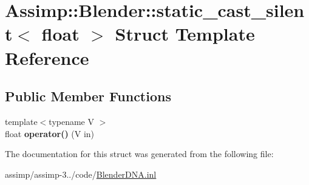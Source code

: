 \hypertarget{struct_assimp_1_1_blender_1_1static__cast__silent_3_01float_01_4}{\section{Assimp\+:\+:Blender\+:\+:static\+\_\+cast\+\_\+silent$<$ float $>$ Struct Template Reference}
\label{struct_assimp_1_1_blender_1_1static__cast__silent_3_01float_01_4}
}
\subsection*{Public Member Functions}
\begin{DoxyCompactItemize}
\item 
\hypertarget{struct_assimp_1_1_blender_1_1static__cast__silent_3_01float_01_4_afe7163b34d6724576abbf6d8762a4642}{{\footnotesize template$<$typename V $>$ }\\float {\bfseries operator()} (V in)}\label{struct_assimp_1_1_blender_1_1static__cast__silent_3_01float_01_4_afe7163b34d6724576abbf6d8762a4642}

\end{DoxyCompactItemize}


The documentation for this struct was generated from the following file\+:\begin{DoxyCompactItemize}
\item 
assimp/assimp-\/3../code/\hyperlink{_blender_d_n_a_8inl}{Blender\+D\+N\+A.\+inl}\end{DoxyCompactItemize}
